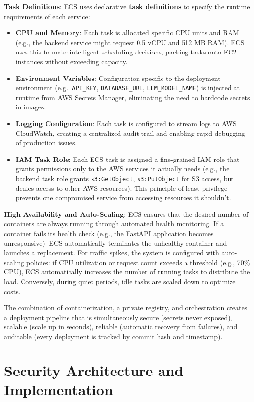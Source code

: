 \textbf{Task Definitions}: ECS uses declarative \textbf{task definitions} to specify the runtime requirements of each service:
\begin{itemize}
    \item \textbf{CPU and Memory}: Each task is allocated specific CPU units and RAM (e.g., the backend service might request 0.5 vCPU and 512 MB RAM). ECS uses this to make intelligent scheduling decisions, packing tasks onto EC2 instances without exceeding capacity.
    \item \textbf{Environment Variables}: Configuration specific to the deployment environment (e.g., \texttt{API\_KEY}, \texttt{DATABASE\_URL}, \texttt{LLM\_MODEL\_NAME}) is injected at runtime from AWS Secrets Manager, eliminating the need to hardcode secrets in images.
    \item \textbf{Logging Configuration}: Each task is configured to stream logs to AWS CloudWatch, creating a centralized audit trail and enabling rapid debugging of production issues.
    \item \textbf{IAM Task Role}: Each ECS task is assigned a fine-grained IAM role that grants permissions only to the AWS services it actually needs (e.g., the backend task role grants \texttt{s3:GetObject}, \texttt{s3:PutObject} for S3 access, but denies access to other AWS resources). This principle of least privilege prevents one compromised service from accessing resources it shouldn't.
\end{itemize}

\textbf{High Availability and Auto-Scaling}: ECS ensures that the desired number of containers are always running through automated health monitoring. If a container fails its health check (e.g., the FastAPI application becomes unresponsive), ECS automatically terminates the unhealthy container and launches a replacement. For traffic spikes, the system is configured with auto-scaling policies: if CPU utilization or request count exceeds a threshold (e.g., 70\% CPU), ECS automatically increases the number of running tasks to distribute the load. Conversely, during quiet periods, idle tasks are scaled down to optimize costs.

The combination of containerization, a private registry, and orchestration creates a deployment pipeline that is simultaneously secure (secrets never exposed), scalable (scale up in seconds), reliable (automatic recovery from failures), and auditable (every deployment is tracked by commit hash and timestamp).

\section{Security Architecture and Implementation}

